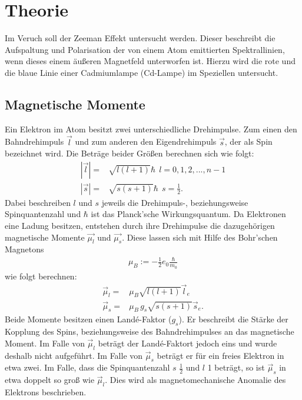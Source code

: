 \section{Theorie}
Im Veruch soll der Zeeman Effekt untersucht werden. Dieser beschreibt die Aufspaltung und Polarisation
der von einem Atom emittierten Spektrallinien, wenn dieses einem äußeren Magnetfeld unterworfen
ist. Hierzu wird die rote und die blaue Linie einer Cadmiumlampe (Cd-Lampe) im Speziellen
untersucht.
\subsection{Magnetische Momente}
Ein Elektron im Atom besitzt zwei unterschiedliche Drehimpulse. Zum einen den Bahndrehimpuls
$\vec{l}$ und zum anderen den Eigendrehimpuls $\vec{s}$, der als Spin bezeichnet wird.
Die Beträge beider Größen berechnen sich wie folgt:
\begin{align*}
    |\vec{l}| =& \sqrt{l(l+1)}\hbar \ \ l = {0, 1, 2, ..., n-1}\\
    |\vec{s}| =& \sqrt{s(s+1)}\hbar \ \ s = \frac{1}{2}.
\end{align*}
Dabei beschreiben $l$ und $s$ jeweils die Drehimpuls-, beziehungsweise Spinquantenzahl
und $\hbar$ ist das Planck'sche Wirkungsquantum.
Da Elektronen eine Ladung besitzen, entstehen durch ihre Drehimpulse die dazugehörigen
magnetische Momente $\vec{\mu_l}$ und $\vec{\mu_s}$.
Diese lassen sich mit Hilfe des Bohr'schen Magnetons
\FloatBarrier
\begin{align*}
    \mu_B := -\frac{1}{2}e_0\frac{\hbar}{m_0}
\end{align*}
wie folgt berechnen:
\begin{align*}
    \vec{\mu}_l =& \mu_B\sqrt{l(l+1)}\vec{l}_e\\
    \vec{\mu}_s =& \mu_B \, g_s \sqrt{s(s+1)} \vec{s}_e .
\end{align*}
Beide Momente besitzen einen Landé-Faktor ($g_s$). Er beschreibt die Stärke der Kopplung des
Spins, beziehungsweise des Bahndrehimpulses an das magnetische Moment. Im Falle von
$\vec{\mu}_l$ beträgt der Landé-Faktort jedoch eins und wurde deshalb nicht aufgeführt.
Im Falle von $\vec{\mu}_s$ beträgt er für ein freies Elektron in etwa zwei.
Im Falle, dass die Spinquantenzahl $s$ $\frac{1}{2}$ und $l$ 1 beträgt, so ist
$\vec{\mu}_s$ in etwa doppelt so groß wie $\vec{\mu}_l$. Dies wird als magnetomechanische
Anomalie des Elektrons beschrieben.

